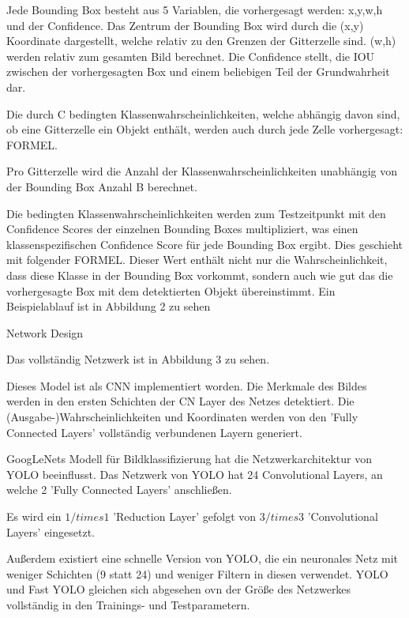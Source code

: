 {\begin{list}{-}{Quelle: \citet{Plastiras2018}}
			\item Jede Bounding Box besteht aus 5 Variablen, die vorhergesagt werden: x,y,w,h und der Confidence. Das Zentrum der Bounding Box wird durch die (x,y) Koordinate dargestellt, welche relativ zu den Grenzen der Gitterzelle sind. (w,h) werden relativ zum gesamten Bild berechnet. Die Confidence stellt, die IOU zwischen der vorhergesagten Box und einem beliebigen Teil der Grundwahrheit dar.
			\item Die durch C bedingten Klassenwahrscheinlichkeiten, welche abhängig davon sind, ob eine Gitterzelle ein Objekt enthält, werden auch durch jede Zelle vorhergesagt: FORMEL. 
			\item Pro Gitterzelle wird die Anzahl der Klassenwahrscheinlichkeiten unabhängig von der Bounding Box Anzahl B berechnet.
			\item Die bedingten Klassenwahrscheinlichkeiten werden zum Testzeitpunkt mit den Confidence Scores der einzelnen Bounding Boxes multipliziert, was einen klassenspezifischen Confidence Score für jede Bounding Box ergibt. Dies geschieht mit folgender FORMEL. Dieser Wert enthält nicht nur die Wahrscheinlichkeit, dass diese Klasse in der Bounding Box vorkommt, sondern auch wie gut das die vorhergesagte Box mit dem detektierten Objekt übereinstimmt. Ein Beispielablauf ist in Abbildung 2 zu sehen
			\item 
			\item 
			\item Network Design
				\item Das vollständig Netzwerk ist in Abbildung 3 zu sehen. 
				\item Dieses Model ist als CNN implementiert worden. Die Merkmale des Bildes werden in den ersten Schichten der CN Layer des Netzes detektiert. Die (Ausgabe-)Wahrscheinlichkeiten und Koordinaten werden von den 'Fully Connected Layers' vollständig verbundenen Layern generiert.
				\item GoogLeNets Modell für Bildklassifizierung hat die Netzwerkarchitektur von YOLO beeinflusst. Das Netzwerk von YOLO hat 24 Convolutional Layers, an welche 2 'Fully Connected Layers' anschließen.
				\item Es wird ein $1 /times 1$ 'Reduction Layer' gefolgt von  $3 /times 3$ 'Convolutional Layers' eingesetzt.
				\item Außerdem existiert eine schnelle Version von YOLO, die ein neuronales Netz mit weniger Schichten (9 statt 24) und weniger Filtern in diesen verwendet. YOLO und Fast YOLO gleichen sich abgesehen ovn der Größe des Netzwerkes vollständig in den Trainings- und Testparametern.

\end{list}}
